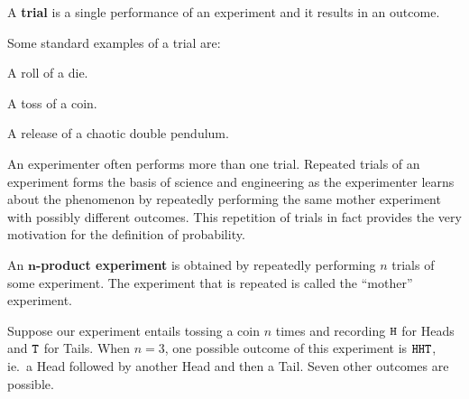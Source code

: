 \begin{definition}
{A {\bf trial} is a single performance of an experiment and it
  results in an outcome.}
\end{definition}



\begin{example}
Some standard examples of a trial are:

\bit

\item A roll of a die.

\item A toss of a coin.

\item A release of a chaotic double pendulum.

\eit
\end{example}

An experimenter often performs more than one trial.  Repeated trials of an experiment forms the basis of science and engineering as the experimenter learns about the phenomenon by repeatedly performing the same mother experiment with possibly different outcomes.  This repetition of trials in fact provides the very motivation for the definition of probability.

\begin{definition}{An {\bf ${\mathbf n}$-product experiment} is obtained by
    repeatedly performing $n$ trials of some experiment. 
    The experiment that is repeated is called the ``mother'' experiment.}
\end{definition}



\begin{example}\label{EX:T3X}
Suppose our experiment entails tossing a coin $n$ times and recording ${\tt H}$ for Heads and ${\tt T}$ for Tails.  When $n=3$, one possible outcome of this experiment is ${\tt HHT}$, ie.~a Head followed by another Head and then a Tail.  Seven other outcomes are possible.  
\end{example}


